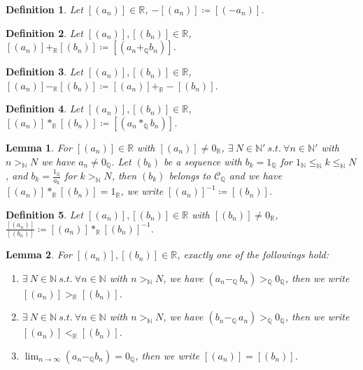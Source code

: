\documentclass[11pt]{article}
\theoremstyle{break}
\theoremstyle{break}
\newtheorem{lem}{Lemma}[thm]
\newtheorem{defn}{Definition}[corL]
\newcommand{\R}{\mathbb{R}}
\newcommand{\N}{\mathbb{N}}
\newcommand{\Q}{\mathbb{Q}}
\newcommand{\C}{\mathcal{C}}
\begin{document}
	\begin{defn}
		Let $[(a_n)] \in \R$, $-[(a_n)] \coloneqq [(-a_n)]$.
	\end{defn}

	\begin{defn}
		Let $[(a_n)],[(b_n)] \in \R$, $[(a_n)] +_{\R} [(b_n)] \coloneqq [(a_n +_{\Q} b_n)]$.
	\end{defn}
	
	\begin{defn}
		Let $[(a_n)],[(b_n)] \in \R$, $[(a_n)] -_{\R} [(b_n)] \coloneqq [(a_n)] +_{\R} -[(b_n)]$.
	\end{defn}	
	
	\begin{defn}
		Let $[(a_n)],[(b_n)] \in \R$, $[(a_n)] \ast_{\R} [(b_n)] \coloneqq [(a_n \ast_{\Q} b_n)]$.
	\end{defn}	
		
	\begin{lem}
		For $[(a_n)] \in \R$ with $[(a_n)] \neq 0_{\R}$, $\exists \ N \in \N' \ s.t. \ \forall n \in \N'$ with $n> _\N N$ we have $a_n \neq 0_{\Q}$. Let $(b_k)$ be a sequence with $b_k = 1_{\Q}$ for $1_\N \leq_\N k \leq_\N N$, and $b_k=\frac{1_{\Q}}{a_k}$ for $k >_\N N$, then $(b_k)$ belongs to $\C_{\Q}$ and we have $[(a_n)] \ast_{\R} [(b_n)] = 1_{\R}$, we write $[(a_n)]^{-1} \coloneqq [(b_n)]$.
	\end{lem}
	
	\begin{defn}
		Let $[(a_n)],[(b_n)] \in \R$ with $[(b_n)] \neq 0_\R$, $\frac{[(a_n)]}{[(b_n)]} \coloneqq [(a_n)] \ast_{\R} [(b_n)]^{-1}$.
	\end{defn}
	
	\begin{lem}
		For $[(a_n)],[(b_n)] \in \R$, exactly one of the followings hold:
		\begin{enumerate}[topsep=3pt,itemsep=-1ex,partopsep=1ex,parsep=1ex]
			\item $\exists \ N \in \N \ s.t. \ \forall n \in \N$ with $n>_{\N} N$, we have $(a_n -_{\Q} \, b_n)>_{\Q} 0_{\Q}$, then we write $[(a_n)] >_{\R} [(b_n)]$.
			\item $\exists \ N \in \N \ s.t. \ \forall n \in \N$ with $n>_{\N} N$, we have $(b_n -_{\Q} \, a_n)>_{\Q} 0_{\Q}$, then we write $[(a_n)] <_{\R} [(b_n)]$.
			\item $\lim_{n \to \infty}(a_n -_\Q b_n)=0_{\Q}$, then we write $[(a_n)]=[(b_n)]$.
		\end{enumerate}
	\end{lem}
	
\end{document}
